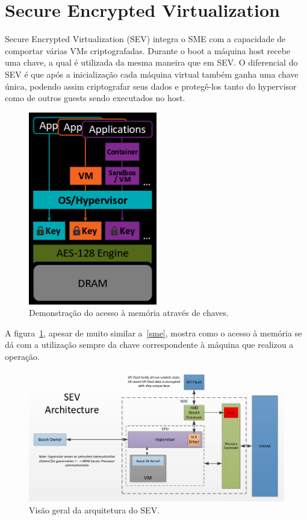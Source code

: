 \documentclass{report}
\begin{document}
\section{Secure Encrypted Virtualization}

Secure Encrypted Virtualization (SEV) integra o SME com a capacidade de
comportar várias VMs criptografadas. Durante o boot a máquina host recebe uma
chave, a qual é utilizada da mesma maneira que em SEV\@. O diferencial do SEV é
que após a inicialização cada máquina virtual também ganha uma chave única,
podendo assim criptografar seus dados e protegê-los tanto do hypervisor como de
outros guests sendo executados no host.

\begin{figure}[h]
    \centering
    \includegraphics[width=0.5\textwidth]{img/sev}
    \caption{Demonstração do acesso à memória através de chaves.}\label{sev}
\end{figure}

A figura~\ref{sev}, apesar de muito similar a~\ref{sme}, mostra como o acesso à
memória se dá com a utilização sempre da chave correspondente à máquina que
realizou a operação.


\begin{figure}[h]
    \centering
    \includegraphics[width=1\textwidth]{img/sev-architecture}
    \caption{Visão geral da arquitetura do SEV\@.}\label{sev-architecture}
\end{figure}
\end{document}
